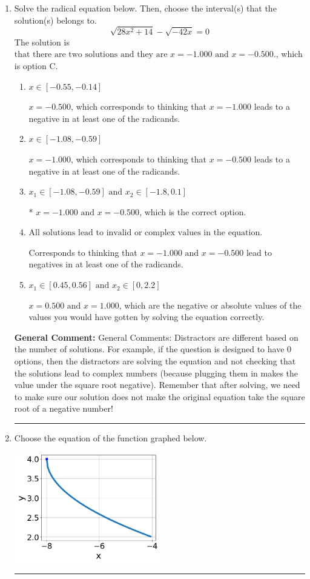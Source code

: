 \documentclass{extbook}[14pt]
\newcommand{\litem}[1]{\item #1

\rule{\textwidth}{0.4pt}}
\begin{document}
\begin{enumerate}\litem{
Solve the radical equation below. Then, choose the interval(s) that the solution(s) belongs to.
\[ \sqrt{28 x^2 + 14} - \sqrt{-42 x} = 0 \]
The solution is \( \text{that there are two solutions and they are } x = -1.000 \text{ and } x = -0.500. \), which is option C.\begin{enumerate}[label=\Alph*.]
\item \( x \in [-0.55,-0.14] \)

$x = -0.500$, which corresponds to thinking that $x = -1.000$ leads to a negative in at least one of the radicands.
\item \( x \in [-1.08,-0.59] \)

$x = -1.000$, which corresponds to thinking that $x = -0.500$ leads to a negative in at least one of the radicands.
\item \( x_1 \in [-1.08, -0.59] \text{ and } x_2 \in [-1.8,0.1] \)

* $x = -1.000 \text{ and } x = -0.500$, which is the correct option.
\item \( \text{All solutions lead to invalid or complex values in the equation.} \)

Corresponds to thinking that $x = -1.000 \text{ and } x = -0.500$ lead to negatives in at least one of the radicands.
\item \( x_1 \in [0.45, 0.56] \text{ and } x_2 \in [0,2.2] \)

$x = 0.500 \text{ and } x = 1.000$, which are the negative or absolute values of the values you would have gotten by solving the equation correctly.
\end{enumerate}

\textbf{General Comment:} General Comments: Distractors are different based on the number of solutions. For example, if the question is designed to have 0 options, then the distractors are solving the equation and not checking that the solutions lead to complex numbers (because plugging them in makes the value under the square root negative). Remember that after solving, we need to make sure our solution does not make the original equation take the square root of a negative number!
}
\litem{
Choose the equation of the function graphed below.

\begin{center}
    \includegraphics[width=0.5\textwidth]{../Figures/radicalGraphToEquationA.png}
\end{center}



}
\end{enumerate}
\end{document}
